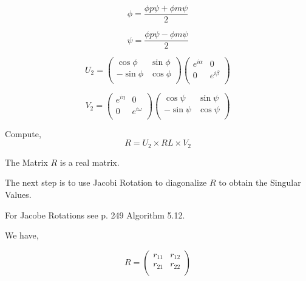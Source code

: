 \begin{equation}
\phi=\frac{\phi p \psi + \phi m \psi }{2}
\end{equation}

\begin{equation}
\psi=\frac{\phi p \psi - \phi m \psi }{2}
\end{equation}


\begin{equation}
U_2=\left(
     \begin{array}{cc}
       \cos \phi   & \sin \phi \\
      - \sin \phi & \cos \phi  \\
     \end{array}
   \right)
\left(
     \begin{array}{cc}
       e^{i\alpha}  & 0 \\
      0 & e^{i\beta} \\
     \end{array}
   \right)
\end{equation}



\begin{equation}
V_2=
\left(
     \begin{array}{cc}
       e^{i\eta}  & 0 \\
      0 & e^{i\omega} \\
     \end{array}
\right)
\left(
     \begin{array}{cc}
       \cos \psi  & \sin \psi \\
       -\sin \psi & \cos \psi  \\
       \end{array}
\right)
\end{equation}


Compute,
\begin{equation}
R=U_2\times RL \times V_2
\end{equation}

The Matrix $R$ is a real matrix.

The next step is to use Jacobi Rotation to diagonalize $R$ to obtain the Singular Values.

For Jacobe Rotations see \cite{Demmel}   p. 249 Algorithm 5.12.

We have,


\begin{equation}\label{test}
    R= \left(
         \begin{array}{cc}
           r_{11} & r_{12} \\
           r_{21} & r_{22} \\
         \end{array}
       \right)
\end{equation}

